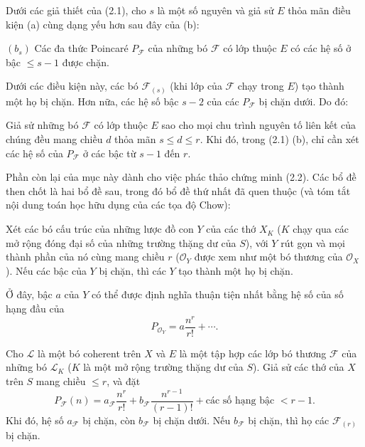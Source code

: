  Dưới các giả thiết của (2.1), cho $s$ là một số nguyên
và giả sử $E$ thỏa mãn điều kiện (a) cùng dạng yếu hơn sau đây của (b):

\medskip
\noindent $(b_s)$ Các đa thức Poincaré $P_{\mathcal F}$ của những bó
$\mathcal F$ có lớp thuộc $E$ có các hệ số ở bậc $\leq s-1$ được chặn.

Dưới các điều kiện này, các bó $\mathcal F_{(s)}$ (khi lớp của $\mathcal F$
chạy trong $E$) tạo thành một họ bị chặn. Hơn nữa, các hệ số bậc $s-2$ của
các $P_{\mathcal F}$ bị chặn dưới.
Do đó:

 Giả sử những bó $\mathcal F$ có lớp thuộc $E$ sao cho
mọi chu trình nguyên tố liên kết của chúng đều mang chiều $d$ thỏa mãn
$s\leq d\leq r$. Khi đó, trong (2.1) (b), chỉ cần xét các hệ số của
$P_{\mathcal F}$ ở các bậc từ $s-1$ đến $r$.

Phần còn lại của mục này dành cho việc phác thảo chứng minh (2.2). Các bổ đề
then chốt là hai bổ đề sau, trong đó bổ đề thứ nhất đã quen thuộc (và tóm tắt
nội dung toán học hữu dụng của các tọa độ Chow):

 Xét các bó cấu trúc của những lược đồ con $Y$ của
các thớ $X_K$ ($K$ chạy qua các mở rộng đóng đại số của những trường thặng dư
của $S$), với $Y$ rút gọn và mọi thành phần của nó cùng mang chiều $r$
($\mathcal O_Y$ được xem như một bó thương của $\mathcal O_X$). Nếu các bậc
của $Y$ bị chặn, thì các $Y$ tạo thành một họ bị chặn.

Ở đây, bậc $a$ của $Y$ có thể được định nghĩa thuận tiện nhất bằng hệ số của
số hạng đầu của
\[
P_{\mathcal O_Y}=a\frac{n^r}{r!}+\cdots.
\]

 Cho $\mathcal L$ là một bó coherent trên $X$ và $E$ là
một tập hợp các lớp bó thương $\mathcal F$ của những bó $\mathcal L_K$ ($K$
là một mở rộng trường thặng dư của $S$). Giả sử các thớ của $X$ trên $S$ mang
chiều $\leq r$, và đặt
\[
P_{\mathcal F}(n)=a_{\mathcal F}\frac{n^r}{r!}
+b_{\mathcal F}\frac{n^{r-1}}{(r-1)!}
+\text{các số hạng bậc $<r-1$}.
\]
Khi đó, hệ số $a_{\mathcal F}$ bị chặn, còn $b_{\mathcal F}$ bị chặn dưới.
Nếu $b_{\mathcal F}$ bị chặn, thì họ các $\mathcal F_{(r)}$ bị chặn.

